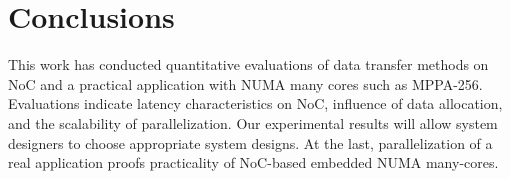 \documentclass[conference,compsoc]{IEEEtran}
\begin{document}

\vspace{-3mm}
\section{Conclusions}
\label{sec:conclusion}
\vspace{-3mm}
This work has conducted quantitative evaluations of data transfer methods on NoC and a practical application with NUMA many cores such as MPPA-256.
Evaluations indicate latency characteristics on NoC, influence of data allocation, and the scalability of parallelization.
Our experimental results will allow system designers to choose appropriate system designs.
At the last, parallelization of a real application proofs practicality of NoC-based embedded NUMA many-cores.
\end{document}
